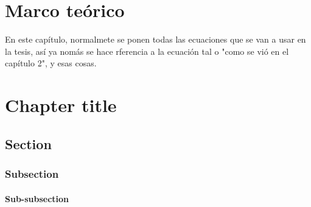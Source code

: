 

\chapter{Marco teórico}

En este capítulo, normalmete se ponen todas las ecuaciones que se van a usar en la tesis, así ya nomás se hace rferencia a la ecuación tal o "como se vió en el capítulo 2", y esas cosas. 

\chapter{Chapter title}

    \section{Section}

        \subsection{Subsection}
            \subsubsection{Sub-subsection}
\blindtext